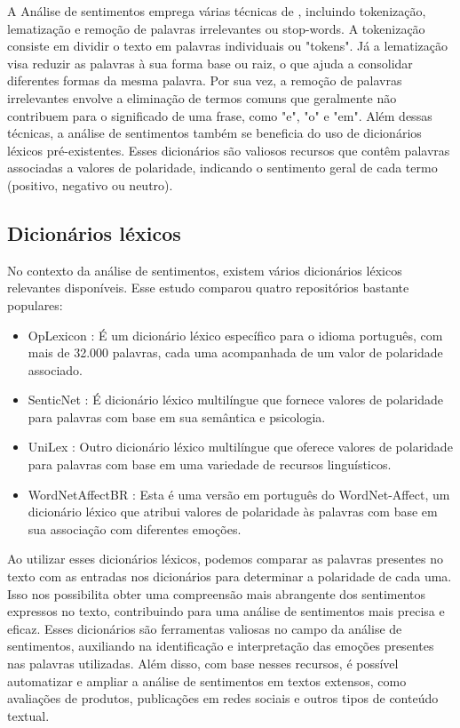 A Análise de sentimentos emprega várias técnicas de , incluindo tokenização, lematização e remoção de palavras irrelevantes ou stop-words. A tokenização consiste em dividir o texto em palavras individuais ou "tokens". Já a lematização visa reduzir as palavras à sua forma base ou raiz, o que ajuda a consolidar diferentes formas da mesma palavra. Por sua vez, a remoção de palavras irrelevantes envolve a eliminação de termos comuns que geralmente não contribuem para o significado de uma frase, como "e", "o" e "em". Além dessas técnicas, a análise de sentimentos também se beneficia do uso de dicionários léxicos pré-existentes. Esses dicionários são valiosos recursos que contêm palavras associadas a valores de polaridade, indicando o sentimento geral de cada termo (positivo, negativo ou neutro).

\subsection{Dicionários léxicos}
\label{sec:dicionarios_lexicos}

No contexto da análise de sentimentos, existem vários dicionários léxicos relevantes disponíveis. Esse estudo comparou quatro repositórios bastante populares:

\begin{itemize}
	\item OpLexicon \cite{2011_Souza_IP}: É um dicionário léxico específico para o idioma português, com mais de 32.000 palavras, cada uma acompanhada de um valor de polaridade associado.
	\item SenticNet \cite{2016_Cambria_IP}: É dicionário léxico multilíngue que fornece valores de polaridade para palavras com base em sua semântica e psicologia.
	\item UniLex \cite{2017_Souza}: Outro dicionário léxico multilíngue que oferece valores de polaridade para palavras com base em uma variedade de recursos linguísticos.
	\item WordNetAffectBR \cite{2008_Pasqualotti}: Esta é uma versão em português do WordNet-Affect, um dicionário léxico que atribui valores de polaridade às palavras com base em sua associação com diferentes emoções.
\end{itemize}

Ao utilizar esses dicionários léxicos, podemos comparar as palavras presentes no texto com as entradas nos dicionários para determinar a polaridade de cada uma. Isso nos possibilita obter uma compreensão mais abrangente dos sentimentos expressos no texto, contribuindo para uma análise de sentimentos mais precisa e eficaz. Esses dicionários são ferramentas valiosas no campo da análise de sentimentos, auxiliando na identificação e interpretação das emoções presentes nas palavras utilizadas. Além disso, com base nesses recursos, é possível automatizar e ampliar a análise de sentimentos em textos extensos, como avaliações de produtos, publicações em redes sociais e outros tipos de conteúdo textual.

